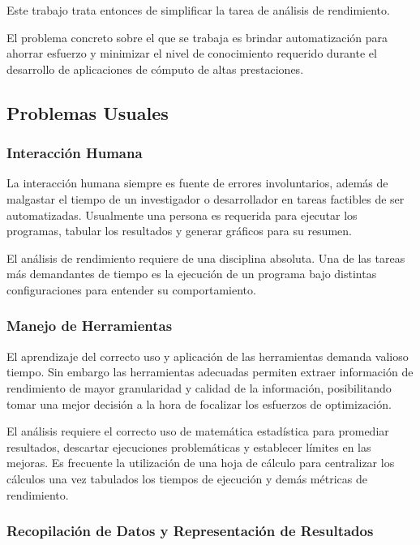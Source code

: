 \documentclass[a4paper]{report}
\begin{document}
Este trabajo trata entonces de simplificar la tarea de análisis de rendimiento. 

\bigskip

El problema concreto sobre el que se trabaja es brindar automatización para ahorrar esfuerzo y minimizar el nivel de conocimiento requerido durante el desarrollo de aplicaciones de cómputo de
altas prestaciones.

\subsection{Problemas Usuales}

\subsubsection{Interacción Humana}

La interacción humana siempre es fuente de errores involuntarios, además de malgastar el tiempo de un investigador o desarrollador en tareas factibles de ser automatizadas. Usualmente una persona es requerida para ejecutar los programas, tabular los resultados y generar gráficos para su resumen.

\bigskip

El análisis de rendimiento requiere de una disciplina absoluta. Una de las tareas más demandantes de tiempo es la ejecución de un programa bajo distintas configuraciones para entender su comportamiento.

\subsubsection{Manejo de Herramientas}

El aprendizaje del correcto uso y aplicación de las herramientas demanda valioso tiempo.
Sin embargo las herramientas adecuadas permiten extraer información de rendimiento de mayor granularidad y calidad de la información, posibilitando tomar una mejor decisión a la hora de focalizar los esfuerzos de optimización.

\bigskip

El análisis requiere el correcto uso de matemática estadística para promediar resultados, descartar ejecuciones problemáticas y establecer límites en las mejoras. Es frecuente la utilización de una hoja de cálculo para centralizar los cálculos una vez tabulados los tiempos de ejecución y demás métricas de rendimiento.

\subsubsection{Recopilación de Datos y Representación de Resultados}
\end{document}
